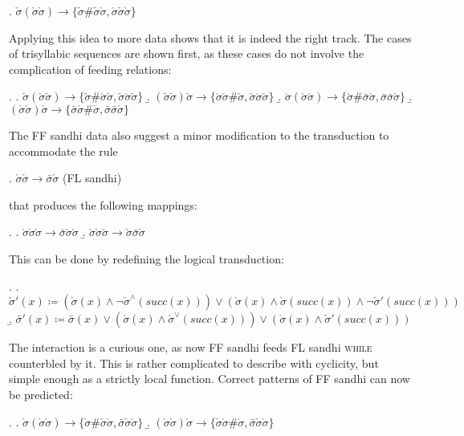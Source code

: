 \documentclass[12pt, a4paper]{report}
\newcommand{\textemph}[1]{\textsc{#1}}
\begin{document}
\ex. \(\check{\sigma}(\grave{\sigma}\grave{\sigma}) \to
\{\check{\sigma}\#\check{\sigma}\grave{\sigma},
\acute{\sigma}\check{\sigma}\grave{\sigma}\}\)


Applying this idea to more data shows that it is indeed the right
track.  The cases of trisyllabic sequences are shown first, as these
cases do not involve the complication of feeding relations:

\ex.
\a. \(\check{\sigma}(\check{\sigma}\check{\sigma}) \to
\{\check{\sigma}\#\acute{\sigma}\check{\sigma},
\check{\sigma}\acute{\sigma}\check{\sigma}\}\)
\b. \((\check{\sigma}\check{\sigma})\check{\sigma} \to
\{\acute{\sigma}\check{\sigma}\#\check{\sigma},
\check{\sigma}\acute{\sigma}\check{\sigma}\}\)
\b. \(\acute{\sigma}(\acute{\sigma}\acute{\sigma}) \to
\{\acute{\sigma}\#\bar{\sigma}\acute{\sigma},
\bar{\sigma}\bar{\sigma}\acute{\sigma}\}\)
\b. \((\acute{\sigma}\acute{\sigma})\acute{\sigma} \to
\{\bar{\sigma}\acute{\sigma}\#\acute{\sigma},
\bar{\sigma}\bar{\sigma}\acute{\sigma}\}\)

The FF sandhi data also suggest a minor modification to the
transduction to accommodate the rule

\ex. \(\grave{\sigma}\check{\sigma} \to \bar{\sigma}\check{\sigma}\)
\hfill(FL sandhi)

that produces the following mappings:

\ex.
\a. \(\grave{\sigma}\grave{\sigma}\grave{\sigma} \to
\bar{\sigma}\check{\sigma}\grave{\sigma}\)
\b. \(\grave{\sigma}\grave{\sigma}\check{\sigma} \to
\check{\sigma}\bar{\sigma}\check{\sigma}\)

This can be done by redefining the logical transduction:

\ex.
\a. \(\check{\sigma}'(x) \coloneq
(\check{\sigma}(x) \land
\neg\check{\sigma}^{\land}(\mathit{succ}(x))) \lor
(\grave{\sigma}(x) \land
\grave{\sigma}(\mathit{succ}(x)) \land
\neg\check{\sigma}'(\mathit{succ}(x)))\)
\b. \(\bar{\sigma}'(x) \coloneq \bar{\sigma}(x) \lor
(\acute{\sigma}(x) \land
\acute{\sigma}^{\lor}(\mathit{succ}(x))) \lor
(\grave{\sigma}(x) \land
\check{\sigma}'(\mathit{succ}(x)))\)

The interaction is a curious one, as now FF sandhi feeds FL sandhi
\textemph{while} counterbled by it.  This is rather complicated to
describe with cyclicity, but simple enough as a strictly local
function.  Correct patterns of FF sandhi can now be predicted:

\ex.
\a. \(\grave{\sigma}(\grave{\sigma}\grave{\sigma}) \to
\{\grave{\sigma}\#\check{\sigma}\grave{\sigma},
\bar{\sigma}\check{\sigma}\grave{\sigma}\}\)
\b. \((\grave{\sigma}\grave{\sigma})\grave{\sigma} \to
\{\check{\sigma}\grave{\sigma}\#\grave{\sigma},
\bar{\sigma}\check{\sigma}\grave{\sigma}\}\)
\end{document}
